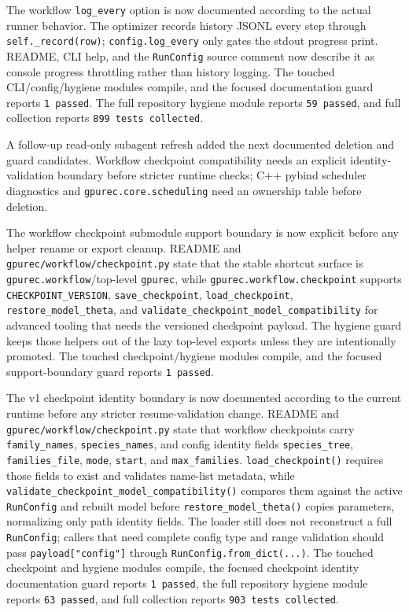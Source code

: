 \documentclass[11pt]{article}
\begin{document}
The workflow \texttt{log\_every} option is now documented according to the
actual runner behavior.  The optimizer records history JSONL every step through
\texttt{self.\_record(row)}; \texttt{config.log\_every} only gates the stdout
progress print.  README, CLI help, and the \texttt{RunConfig} source comment
now describe it as console progress throttling rather than history logging.
The touched CLI/config/hygiene modules compile, and the focused documentation
guard reports \texttt{1 passed}.  The full repository hygiene module reports
\texttt{59 passed}, and full collection reports \texttt{899 tests collected}.

A follow-up read-only subagent refresh added the next documented deletion and
guard candidates.  Workflow checkpoint compatibility needs an explicit
identity-validation boundary before stricter runtime checks; C++ pybind
scheduler diagnostics and \texttt{gpurec.core.scheduling} need an ownership
table before deletion.

The workflow checkpoint submodule support boundary is now explicit before any
helper rename or export cleanup.  README and
\texttt{gpurec/workflow/checkpoint.py} state that the stable shortcut surface is
\texttt{gpurec.workflow}/top-level \texttt{gpurec}, while
\texttt{gpurec.workflow.checkpoint} supports
\texttt{CHECKPOINT\_VERSION}, \texttt{save\_checkpoint},
\texttt{load\_checkpoint}, \texttt{restore\_model\_theta}, and
\texttt{validate\_checkpoint\_model\_compatibility} for advanced tooling that
needs the versioned checkpoint payload.  The hygiene guard keeps those helpers
out of the lazy top-level exports unless they are intentionally promoted.  The
touched checkpoint/hygiene modules compile, and the focused support-boundary
guard reports \texttt{1 passed}.

The v1 checkpoint identity boundary is now documented according to the current
runtime before any stricter resume-validation change.  README and
\texttt{gpurec/workflow/checkpoint.py} state that workflow checkpoints carry
\texttt{family\_names}, \texttt{species\_names}, and config identity fields
\texttt{species\_tree}, \texttt{families\_file}, \texttt{mode},
\texttt{start}, and \texttt{max\_families}.  \texttt{load\_checkpoint()} requires
those fields to exist and validates name-list metadata, while
\texttt{validate\_checkpoint\_model\_compatibility()} compares them against the
active \texttt{RunConfig} and rebuilt model before
\texttt{restore\_model\_theta()} copies parameters, normalizing only path
identity fields.  The loader still does not reconstruct a full
\texttt{RunConfig}; callers that need complete config type and range validation
should pass \texttt{payload["config"]} through
\texttt{RunConfig.from\_dict(...)}.  The touched checkpoint and hygiene modules
compile, the focused checkpoint identity documentation guard reports
\texttt{1 passed}, the full repository hygiene module reports \texttt{63
passed}, and full collection reports \texttt{903 tests collected}.
\end{document}
